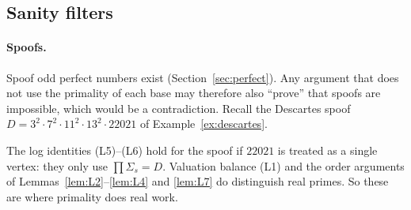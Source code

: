 \documentclass[11pt]{article}
\theoremstyle{definition}
\theoremstyle{remark}
\begin{document}
\subsection{Sanity filters}

\paragraph{Spoofs.}
Spoof odd perfect numbers exist (Section~\ref{sec:perfect}).  Any argument
that does not use the primality of each base may therefore also ``prove''
that spoofs are impossible, which would be a contradiction.  Recall the
Descartes spoof $D=3^2\cdot7^2\cdot11^2\cdot13^2\cdot22021$ of
Example~\ref{ex:descartes}.

The log identities (L5)--(L6) hold for the spoof if $22021$ is treated
as a single vertex: they only use $\prod\Sigma_s=D$. Valuation balance
(L1) and the order arguments of Lemmas~\ref{lem:L2}--\ref{lem:L4} and
\ref{lem:L7} do distinguish real primes. So these are where primality
does real work.
\end{document}
